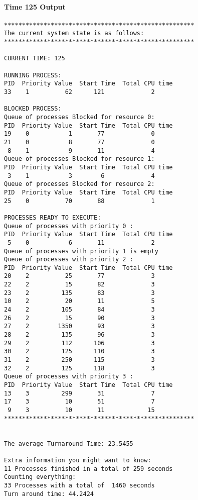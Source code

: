 \paragraph*{Time 125 Output}
\indent \fontsize{10}{9.7}\selectfont \begin{verbatim}
*****************************************************
The current system state is as follows:
*****************************************************

CURRENT TIME: 125

RUNNING PROCESS:
PID  Priority Value  Start Time  Total CPU time
33    1          62      121             2

BLOCKED PROCESS:
Queue of processes Blocked for resource 0:
PID  Priority Value  Start Time  Total CPU time
19    0           1       77             0
21    0           8       77             0
 8    1           9       11             4
Queue of processes Blocked for resource 1:
PID  Priority Value  Start Time  Total CPU time
 3    1           3        6             4
Queue of processes Blocked for resource 2:
PID  Priority Value  Start Time  Total CPU time
25    0          70       88             1

PROCESSES READY TO EXECUTE:
Queue of processes with priority 0 :
PID  Priority Value  Start Time  Total CPU time
 5    0           6       11             2
Queue of processes with priority 1 is empty
Queue of processes with priority 2 :
PID  Priority Value  Start Time  Total CPU time
20    2          25       77             3
22    2          15       82             3
23    2         135       83             3
10    2          20       11             5
24    2         105       84             3
26    2          15       90             3
27    2        1350       93             3
28    2         135       96             3
29    2         112      106             3
30    2         125      110             3
31    2         250      115             3
32    2         125      118             3
Queue of processes with priority 3 :
PID  Priority Value  Start Time  Total CPU time
13    3         299       31             7
17    3          10       51             7
 9    3          10       11            15
*****************************************************


The average Turnaround Time: 23.5455

Extra information you might want to know:
11 Processes finished in a total of 259 seconds
Counting everything:
33 Processes with a total of  1460 seconds
Turn around time: 44.2424
    \end{verbatim}
    